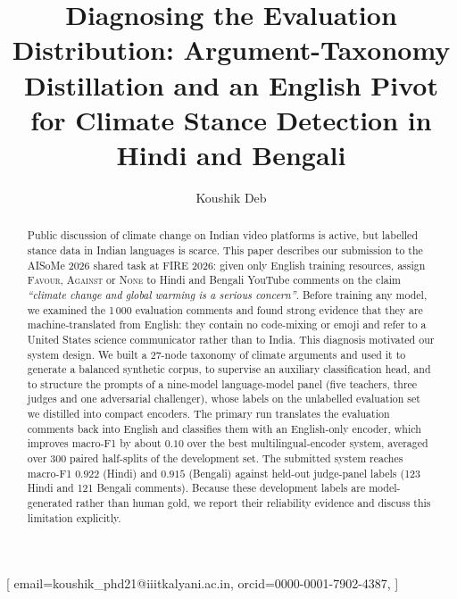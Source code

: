 \documentclass{ceurart}
\begin{document}


\title{Diagnosing the Evaluation Distribution: Argument-Taxonomy Distillation
  and an English Pivot for Climate Stance Detection in Hindi and Bengali}

\author[1]{Koushik Deb}[
  email=koushik\string_phd21@iiitkalyani.ac.in,
  orcid=0000-0001-7902-4387,
]
\address[1]{Indian Institute of Information Technology Kalyani, Kalyani,
  West Bengal, 741235, India}

\begin{abstract}
  Public discussion of climate change on Indian video platforms is active,
  but labelled stance data in Indian languages is scarce. This paper
  describes our submission to the AISoMe 2026 shared task at FIRE 2026:
  given only English training resources, assign \textsc{Favour},
  \textsc{Against} or \textsc{None} to Hindi and Bengali YouTube comments on
  the claim \emph{``climate change and global warming is a serious
  concern''}. Before training any model, we examined the 1\,000 evaluation
  comments and found strong evidence that they are machine-translated from
  English: they contain no code-mixing or emoji and refer to a United States
  science communicator rather than to India. This diagnosis motivated our
  system design. We built a 27-node taxonomy of
  climate arguments and used it to generate a balanced synthetic corpus, to
  supervise an auxiliary classification head, and to structure the prompts of
  a nine-model language-model panel (five teachers, three judges and one
  adversarial challenger), whose labels on the unlabelled
  evaluation set we distilled into compact encoders. The primary run
  translates the evaluation comments back into English and classifies them
  with an English-only encoder, which improves macro-F1 by about $0.10$ over
  the best multilingual-encoder system, averaged over 300 paired half-splits
  of the development set. The submitted
  system reaches macro-F1 $0.922$ (Hindi) and $0.915$ (Bengali) against
  held-out judge-panel labels (123 Hindi and 121 Bengali comments). Because these development labels are
  model-generated rather than human gold, we report their reliability
  evidence and discuss this limitation explicitly.
\end{abstract}
\end{document}
